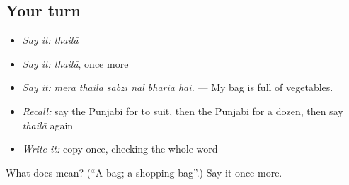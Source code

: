 \subsection*{Your turn}
\begin{itemize}
\raggedright
  \item \emph{Say it:} \emph{thailā}
  \item \emph{Say it:} \emph{thailā}, once more
  \item \emph{Say it:} \emph{merā thailā sabzī nāl bhariā hai.} — My bag is full of vegetables.
  \item \emph{Recall:} say the Punjabi for to suit, then the Punjabi for a dozen, then say \emph{thailā} again
  \item \emph{Write it:} copy \textbf{} once, checking the whole word
\end{itemize}

\begin{tcolorbox}[breakable,colback=teal!4,colframe=teal!35!black,title={Before you move on}]
What does  mean? (\textquotedblleft{}A bag; a shopping bag\textquotedblright{}.) Say it once more.
\end{tcolorbox}

